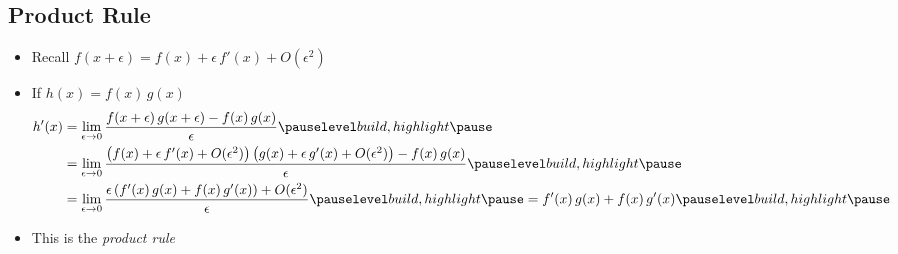 \begin{slide}
  \section{Product Rule}

\begin{PauseHighLight}
  \begin{itemize}
  \item Recall $f(x+\epsilon) = f(x) + \epsilon\, f'(x) + O(\epsilon^2)$
  \item If $h(x) = f(x)\, g(x)$\pause
    {\small
    \begin{align*}
      h'(x) &= \lim_{\epsilon\rightarrow 0}
      \frac{f(x+\epsilon)\,g(x+\epsilon)-f(x)\,g(x)}{\epsilon}\pauseb \\
      &= \lim_{\epsilon\rightarrow 0} \frac{\bra{f(x) + \epsilon\, f'(x) +
    O(\epsilon^2)} \bra{g(x) + \epsilon\, g'(x) +
              O(\epsilon^2)}-f(x)\,g(x)}{\epsilon}\pauseb \\
      &= \lim_{\epsilon\rightarrow 0} \frac{\epsilon \bra{f'(x)\,g(x) +
        f(x)\,g'(x)}+O(\epsilon^2)}{\epsilon}\pauseb
        = f'(x)\,g(x) + f(x)\,g'(x)\pauseb
    \end{align*}}
  \item This is the \emph{product rule}\pauseb
  \end{itemize}
\end{PauseHighLight}

\end{slide}



